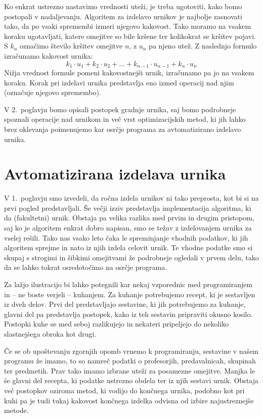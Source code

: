 \documentclass[a4paper,10pt]{article}
\begin{document}
Ko enkrat ustrezno nastavimo vrednosti uteži, je treba ugotoviti, kako bomo postopali
v nadaljevanju. Algoritem za izdelavo urnikov je najbolje zasnovati tako, da po vsaki
spremembi izmeri njegovo kakovost. Tako moramo na vsakem koraku ugotavljati, katere
omejitve so bile kršene ter kolikokrat se kršitev pojavi. S \(k_{n}\) označimo število
kršitev omejitve \(n\), z \(u_n\) pa njeno utež. Z naslednjo formulo izračunamo
kakovost urnika:
\[
   k_1 \cdot u_1 + k_2 \cdot u_2 + ... + k_{n-1} \cdot u_{n-1} + k_n \cdot u_n
\]
Nižja vrednost formule pomeni kakovostnejši urnik, izračunamo pa jo na vsakem koraku.
Korak pri izdelavi urnika predstavlja eno izmed operacij nad njim (označuje njegovo
spremembo).

V 2.~poglavju bomo opisali postopek gradnje urnika, saj bomo podrobneje spoznali
operacije nad urnikom in več vrst optimizacijskih metod, ki jih lahko brez oklevanja
poimenujemo kar osrčje programa za avtomatizirano izdelavo urnika.

\section{Avtomatizirana izdelava urnika}

V 1.~poglavju smo izvedeli, da ročna izdela urnikov ni tako preprosta, kot bi si
na prvi pogled predstavljali. Še večji izziv predstavlja implementacija algoritma, ki da
(fakultetni) urnik. Obstaja pa velika razlika med prvim in drugim pristopom, saj ko je
algoritem enkrat dobro napisan, smo se težav z izdelovanjem urnika za vselej rešili.
Tako nas vsako leto čaka le spreminjanje vhodnih podatkov, ki jih algoritem sprejme in
nato iz njih izdela celovit urnik. Te vhodne podatke smo si skupaj s strogimi in šibkimi
omejitvami že podrobneje ogledali v prvem delu, tako da se lahko tokrat osredotočimo na
osrčje programa.

Za lažjo ilustracijo bi lahko potegnili kar nekaj vzporednic med programiranjem in -- ne
boste verjeli -- kuhanjem. Za kuhanje potrebujemo recept, ki je sestavljen iz dveh delov.
Prvi del predstavljajo sestavine, ki jih potrebujemo za kuhanje, glavni del pa predstavlja
postopek, kako iz teh sestavin pripraviti okusno kosilo. Postopki kuhe se med seboj
razlikujejo in nekateri pripeljejo do nekoliko slastnejšega obroka kot drugi.

Če se ob upoštevanju zgornjih opomb vrnemo k programiranju, sestavine v našem programu že
imamo, to so namreč podatki o profesorjih, predavalnicah, skupinah ter predmetih. Prav tako
imamo izbrane uteži za posamezne omejitve. Manjka le še glavni del recepta, ki podatke
ustrezno obdela ter iz njih sestavi urnik. Obstaja več postopkov oziroma metod, ki vodijo
do končnega urnika, podobno kot pri kuhi pa je tudi tukaj kakovost končnega izdelka odvisna
od izbire najustreznejše metode.
\end{document}
